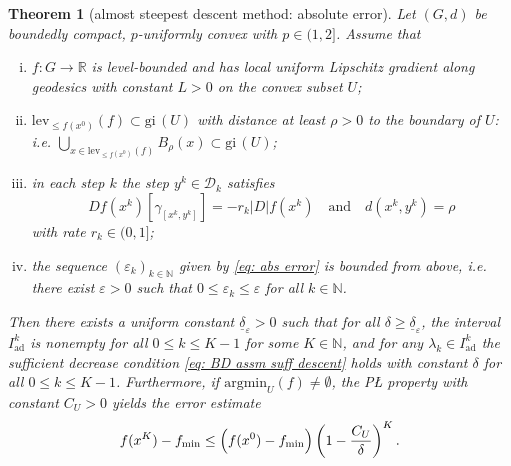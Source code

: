 \documentclass{article}
\theoremstyle{plain}\newtheorem{theorem}{Theorem}[section]
\theoremstyle{plain}\newtheorem{definition}[theorem]{Definition}
\theoremstyle{plain}\newtheorem{lemma}[theorem]{Lemma}
\theoremstyle{definition}\newtheorem{remark}[theorem]{Remark}
\theoremstyle{definition}\newtheorem{example}[theorem]{Example}
\theoremstyle{plain}\newtheorem{proposition}[theorem]{Proposition}
\theoremstyle{plain}\newtheorem{inference}[theorem]{Inference}
\theoremstyle{plain}\newtheorem{corollary}[theorem]{Corollary}
\theoremstyle{plain}\newtheorem{assumption}[theorem]{Assumption}
\newcommand{\bbN}{\mathbb{N}}
\begin{document}
\begin{theorem}[almost steepest descent method: absolute error]\label{th: ID method 2}
    Let $(G,d)$ be boundedly compact, $p$-uniformly convex with $p\in(1,2]$. Assume that
    \begin{enumerate}[(i)]
        \item $f:G\to\mathbb{R}$ is level-bounded and has local uniform Lipschitz gradient along geodesics with constant $L>0$ on the convex subset $U$;
        \item $\mathrm{lev}_{\leq f(x^0)}(f)\subset \mathrm{gi}\,(U)$ with distance at least $\rho>0$ to the boundary of $U$: i.e. $\bigcup_{x\in \mathrm{lev}_{\leq f(x^0)}(f)} B_\rho(x)\subset \mathrm{gi}\,(U)$;
        \item in each step $k$ the step $y^k\in\mathcal{D}_k$ satisfies
        \begin{equation}\label{eq: ID method y^k 2}
            Df(x^k)[\gamma_{[x^k,y^k]}]=-r_k|D|f(x^k)\quad\text{and}\quad d(x^k,y^k)=\rho
        \end{equation}
        with rate $r_k\in(0,1]$;
        \item the sequence $(\varepsilon_k)_{k\in\bbN}$ given by \eqref{eq: abs error} is bounded from above, i.e. there exist $\varepsilon>0$ such that $0\leq\varepsilon_k\leq\varepsilon$ for all $k\in\bbN$.
    \end{enumerate}
    Then there exists a uniform constant $\underline{\delta}_\varepsilon>0$ such that for all $\delta\geq\underline{\delta}_\varepsilon$, the interval $I_{\mathrm{ad}}^k$ is nonempty for all $0\leq k\leq K-1$ for some $K\in\bbN$, and for any $\lambda_k\in I_{\mathrm{ad}}^k$ the sufficient decrease condition \eqref{eq: BD assm suff descent} holds with constant $\delta$ for all $0\leq k\leq K-1$. Furthermore, if $\mathrm{argmin}_U(f)\neq\emptyset$, the PŁ property with constant $C_U>0$ yields the error estimate
    $$
    f(x^K)-f_{\min}\leq\Bigl(f(x^0)-f_{\min}\Bigr)\left(1-\frac{C_U}{\delta}\right)^K.
    $$
\end{theorem}
\end{document}
